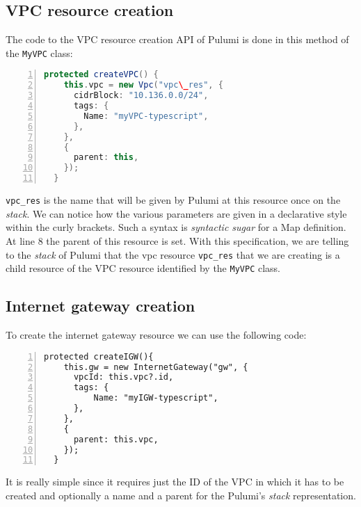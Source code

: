 \subsection{VPC resource creation}
The code to the VPC resource creation API of Pulumi is done in this method of the \texttt{MyVPC} class:\\
\begin{minipage}{\linewidth}
\begin{lstlisting}[language=scala, numbers=left, numberstyle=\tiny, numbersep=-5pt, stepnumber=1]
  protected createVPC() {
    this.vpc = new Vpc("vpc\_res", {
      cidrBlock: "10.136.0.0/24",
      tags: {
        Name: "myVPC-typescript",
      },
    },
    {
      parent: this,
    });
  }
\end{lstlisting}
\end{minipage}
\texttt{vpc\_res} is the name that will be given by Pulumi at this resource once on the \textit{stack}.
We can notice how the various parameters are given in a declarative style within the curly brackets.
Such a syntax is \textit{syntactic sugar} for a Map definition.\\
At line 8 the parent of this resource is set.
With this specification, we are telling to the \textit{stack} of Pulumi that the vpc resource \texttt{vpc\_res} that we are creating is a child resource of the VPC resource identified by the \texttt{MyVPC} class.

\subsection{Internet gateway creation}
To create the internet gateway resource we can use the following code:\\
\begin{minipage}{\linewidth}
\begin{lstlisting}[numbers=left, numberstyle=\tiny, numbersep=-5pt, stepnumber=1]
  protected createIGW(){
    this.gw = new InternetGateway("gw", {
      vpcId: this.vpc?.id,
      tags: {
          Name: "myIGW-typescript",
      },
    },
    {
      parent: this.vpc,
    });
  }
\end{lstlisting}
\end{minipage}
It is really simple since it requires just the ID of the VPC in which it has to be created and optionally a name and a parent for the Pulumi's \textit{stack} representation.


